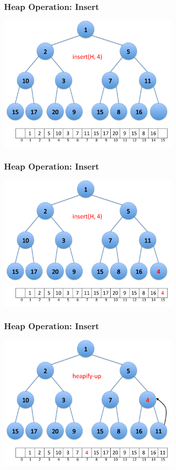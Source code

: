 \documentclass{beamer}
\begin{document}
\begin{frame}[containsverbatim]
\frametitle{Heap Operation: Insert}

\begin{center}
\includegraphics[width=9cm]{heap_insert1.pdf}%
\end{center}

\end{frame}

\begin{frame}[containsverbatim]
\frametitle{Heap Operation: Insert}

\begin{center}
\includegraphics[width=9cm]{heap_insert2.pdf}%
\end{center}

\end{frame}

\begin{frame}[containsverbatim]
\frametitle{Heap Operation: Insert}

\begin{center}
\includegraphics[width=9cm]{heap_insert3.pdf}%
\end{center}

\end{frame}
\end{document}
